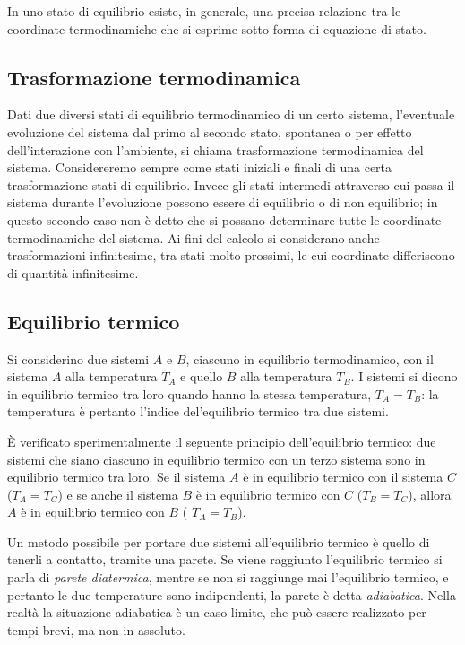 \documentclass[class=book, crop=false, oneside, 12pt]{standalone}
\begin{document}
In uno stato di equilibrio esiste, in generale, una precisa relazione tra le coordinate termodinamiche che si esprime sotto forma di equazione di stato.

\subsection{Trasformazione termodinamica}

Dati due diversi stati di equilibrio termodinamico di un certo sistema, l'eventuale evoluzione del sistema dal primo al secondo stato, spontanea o per effetto dell'interazione con l'ambiente, si chiama trasformazione termodinamica del sistema. 
Considereremo sempre come stati iniziali e finali di una certa trasformazione stati di equilibrio. 
Invece gli stati intermedi attraverso cui passa il sistema durante l'evoluzione possono essere di equilibrio o di non equilibrio; in questo secondo caso non è detto che si possano determinare tutte le coordinate termodinamiche del sistema. 
Ai fini del calcolo si considerano anche trasformazioni infinitesime, tra stati molto prossimi, le cui coordinate differiscono di quantità infinitesime.

\subsection{Equilibrio termico}

Si considerino due sistemi \(A\) e \(B\), ciascuno in equilibrio termodinamico, con il sistema \(A\) alla temperatura \(T_A\) e quello \(B\) alla temperatura \(T_B\).
I sistemi si dicono in equilibrio termico tra loro quando hanno la stessa temperatura, \(T_A = T_B\): la temperatura è pertanto l'indice del'equilibrio termico tra due sistemi. 

È verificato sperimentalmente il seguente principio dell'equilibrio termico: due sistemi che siano ciascuno in equilibrio termico con un terzo sistema sono in equilibrio termico tra loro. 
Se il sistema \(A\) è in equilibrio termico con il sistema \(C\) (\(T_A = T_C\)) e se anche il sistema \(B\) è in equilibrio termico con \(C\) (\(T_B = T_C\)), allora \(A\) è in equilibrio termico con \(B\) ( \(T_A = T_B\)).

Un metodo possibile per portare due sistemi all'equilibrio termico è quello di tenerli a contatto, tramite una parete. 
Se viene raggiunto l'equilibrio termico si parla di \emph{parete diatermica}, mentre se non si raggiunge mai l'equilibrio termico, e pertanto le due temperature sono indipendenti, la parete è detta \emph{adiabatica}. 
Nella realtà la situazione adiabatica è un caso limite, che può essere realizzato per tempi brevi, ma non in assoluto.
\end{document}
